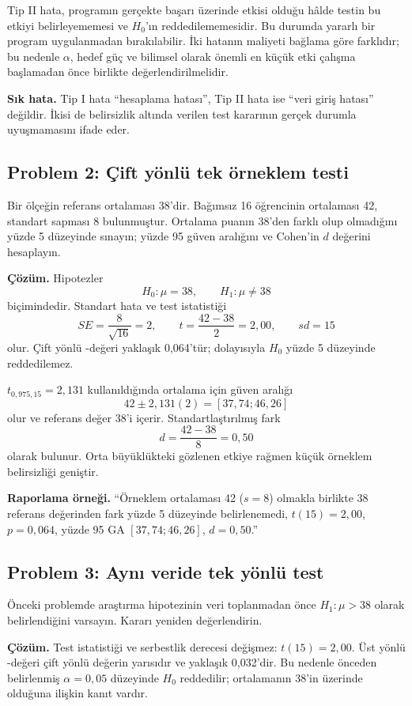 Tip II hata, programın gerçekte başarı üzerinde etkisi olduğu hâlde testin
bu etkiyi belirleyememesi ve $H_0$'ın reddedilememesidir. Bu durumda yararlı
bir program uygulanmadan bırakılabilir. İki hatanın maliyeti bağlama göre
farklıdır; bu nedenle $\alpha$, hedef güç ve bilimsel olarak önemli en küçük
etki çalışma başlamadan önce birlikte değerlendirilmelidir.

\textbf{Sık hata.} Tip I hata ``hesaplama hatası'', Tip II hata ise ``veri
giriş hatası'' değildir. İkisi de belirsizlik altında verilen test kararının
gerçek durumla uyuşmamasını ifade eder.

\subsection*{Problem 2: Çift yönlü tek örneklem \tstat testi}

Bir ölçeğin referans ortalaması 38'dir. Bağımsız 16 öğrencinin ortalaması 42,
standart sapması 8 bulunmuştur. Ortalama puanın 38'den farklı olup olmadığını
yüzde 5 düzeyinde sınayın; yüzde 95 güven aralığını ve Cohen'in $d$ değerini
hesaplayın.

\textbf{Çözüm.} Hipotezler
\[
H_0:\mu=38,
\qquad H_1:\mu\neq38
\]
biçimindedir. Standart hata ve test istatistiği
\[
SE=\frac{8}{\sqrt{16}}=2,
\qquad
t=\frac{42-38}{2}=2{,}00,
\qquad sd=15
\]
olur. Çift yönlü \pval-değeri yaklaşık 0,064'tür; dolayısıyla $H_0$ yüzde 5
düzeyinde reddedilemez.

$t_{0{,}975,15}=2{,}131$ kullanıldığında ortalama için güven aralığı
\[
42\pm2{,}131(2)=[37{,}74;46{,}26]
\]
olur ve referans değer 38'i içerir. Standartlaştırılmış fark
\[
d=\frac{42-38}{8}=0{,}50
\]
olarak bulunur. Orta büyüklükteki gözlenen etkiye rağmen küçük örneklem
belirsizliği geniştir.

\textbf{Raporlama örneği.} ``Örneklem ortalaması 42 ($s=8$) olmakla birlikte
38 referans değerinden fark yüzde 5 düzeyinde belirlenemedi,
$t(15)=2{,}00$, $p=0{,}064$, yüzde 95 GA $[37{,}74;46{,}26]$,
$d=0{,}50$.''

\subsection*{Problem 3: Aynı veride tek yönlü test}

Önceki problemde araştırma hipotezinin veri toplanmadan önce
$H_1:\mu>38$ olarak belirlendiğini varsayın. Kararı yeniden değerlendirin.

\textbf{Çözüm.} Test istatistiği ve serbestlik derecesi değişmez:
$t(15)=2{,}00$. Üst yönlü \pval-değeri çift yönlü değerin yarısıdır ve yaklaşık
0,032'dir. Bu nedenle önceden belirlenmiş $\alpha=0{,}05$ düzeyinde $H_0$
reddedilir; ortalamanın 38'in üzerinde olduğuna ilişkin kanıt vardır.

